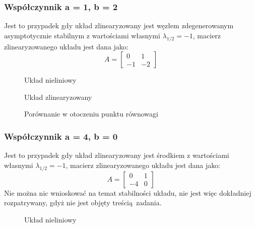 \documentclass[a4paper, 10pt]{article}
\begin{document}
			\subsubsection{Współczynnik a = 1, b = 2}
				Jest to przypadek gdy układ zlinearyzowany jest węzłem zdegenerowanym asymptotycznie stabilnym z wartościami własnymi $\lambda_{1/2} =-1$, macierz zlinearyzowanego układu jest dana jako:
				$$
					A = \begin{bmatrix}
						0 & 1 \\
						-1  & -2
					\end{bmatrix}
				$$
				\begin{figure}[H]
					\centering
					\def \svgwidth{0.8\columnwidth}
					
					\caption{Układ nieliniowy}
				\end{figure}\noindent

				\begin{figure}[H]
					\centering
					\def \svgwidth{0.8\columnwidth}
					
					\caption{Układ zlinearyzowany}
				\end{figure}\noindent

				\begin{figure}[H]
					\centering
					\def \svgwidth{0.8\columnwidth}
					
					\caption{Porównanie w otoczeniu punktu równowagi}
				\end{figure}\noindent

			\subsubsection{Współczynnik a = 4, b = 0}
				Jest to przypadek gdy układ zlinearyzowany jest środkiem z wartościami własnymi $\lambda_{1/2} =-1$, macierz zlinearyzowanego układu jest dana jako:
				$$
					A = \begin{bmatrix}
						0 & 1 \\
						-4  & 0
					\end{bmatrix}
				$$
				Nie można nic wnioskować na temat stabilności układu, nie jest więc dokładniej rozpatrywany, gdyż nie jest objęty treścią zadania.
				\begin{figure}[H]
					\centering
					\def \svgwidth{0.8\columnwidth}
					
					\caption{Układ nieliniowy}
				\end{figure}\noindent
\end{document}
